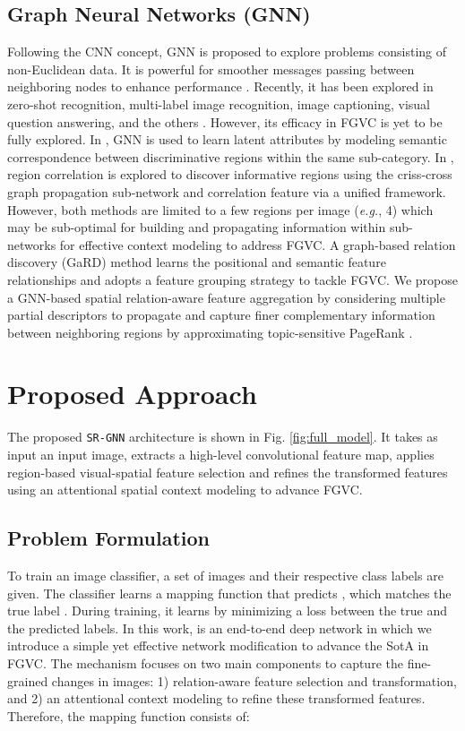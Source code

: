 \documentclass[journal]{IEEEtran}
\begin{document}
\subsection {Graph Neural Networks (GNN)} 
Following the CNN concept, GNN is proposed to explore problems consisting of non-Euclidean data. It is powerful for smoother messages passing between neighboring nodes to enhance performance \cite{kipf2016semi}. Recently, it has been explored in zero-shot recognition, multi-label image recognition, image captioning, visual question answering, and the others \cite{wu2020comprehensive}. However, its efficacy in FGVC is yet to be fully explored. In \cite{wang2020category}, GNN is used to learn latent attributes by modeling semantic correspondence between discriminative regions within the same sub-category. In  \cite{wang2020graph}, region correlation is explored to discover informative regions using the criss-cross graph propagation sub-network and correlation feature via a unified framework. However, both methods are limited to a few regions per image (\textit{e.g.}, 4) which may be sub-optimal for building and propagating information within sub-networks for effective context modeling to address FGVC. A graph-based relation discovery (GaRD) method \cite {zhao2021graph} learns the positional and semantic feature relationships and adopts a feature grouping strategy to tackle FGVC. We propose a GNN-based spatial relation-aware feature aggregation by considering multiple partial descriptors to propagate and capture finer complementary information between neighboring regions by approximating topic-sensitive PageRank \cite{klicpera2018predict}.  
\section{Proposed Approach} \label{proposed}
The proposed \texttt{SR-GNN} architecture is shown in Fig. \ref{fig:full_model}. It takes as input an input image, extracts a high-level convolutional feature map, applies region-based visual-spatial feature selection and refines the transformed features using an attentional spatial context modeling to advance FGVC. 
\vspace{-0.2 cm}
\subsection{Problem Formulation}
To train an image classifier, a set of  images  and their respective class labels are given. The classifier learns a mapping function  that predicts , which matches the true label . During training, it learns  by minimizing a loss  between the true and the predicted labels. In this work,  is an end-to-end deep network in which we introduce a simple yet effective network modification to advance the SotA in FGVC. The mechanism focuses on two main components to capture the fine-grained changes in images: 1) relation-aware feature selection and transformation, and 2) an attentional context modeling to refine these transformed features. Therefore, the mapping function  consists of:\vspace{-.15cm}
 
\end{document}
